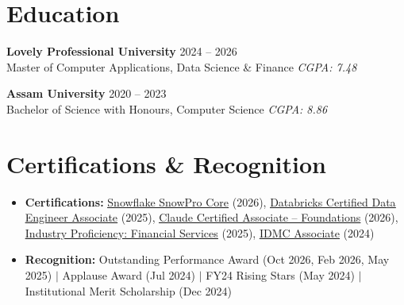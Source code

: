 \documentclass[a4paper,8pt]{article}
\begin{document}
\section{Education}
\textbf{Lovely Professional University} \hfill \color[HTML]{371e77} 2024 -- 2026 \color[HTML]{110223}\\
\color[HTML]{371e77} Master of Computer Applications, Data Science \& Finance \hfill \color[HTML]{4B28A4} {\small \textit{CGPA: 7.48}} \color[HTML]{110223}

\vspace{2pt}

\textbf{Assam University} \hfill \color[HTML]{371e77} 2020 -- 2023 \color[HTML]{110223}\\
\color[HTML]{371e77} Bachelor of Science with Honours, Computer Science \hfill \color[HTML]{4B28A4} {\small \textit{CGPA: 8.86}} \color[HTML]{110223}

\section{Certifications \& Recognition}
\begin{minipage}[t]{\linewidth}
    \begin{itemize}[nosep,after=\strut, leftmargin=2em, itemsep=3pt]
        \item \textbf{Certifications:} \href{https://achieve.snowflake.com/c2358c1b-4da5-4c9a-94c7-e9806cbb3edd}{\uline{Snowflake SnowPro Core}} (2026), \href{https://credentials.databricks.com/64cd3b85-77ab-4c9f-91ba-168c92d27739}{\uline{Databricks Certified Data Engineer Associate}} (2025), \href{https://www.credly.com/badges/c0856f6e-cd57-44e0-9e6c-249e6f24c2fb/public_url}{\uline{Claude Certified Associate -- Foundations}} (2026), \href{https://www.credly.com/badges/3668cded-264d-4834-8851-eb2cc87358d3}{\uline{Industry Proficiency: Financial Services}} (2025), \href{https://drive.google.com/file/d/1xK0TLpdXRCAxnX8DlwNyQrvbyeU8dWXC/view}{\uline{IDMC Associate}} (2024)
        \vspace{3pt}
        \item \textbf{Recognition:} Outstanding Performance Award (Oct 2026, Feb 2026, May 2025) $|$ Applause Award (Jul 2024) $|$ FY24 Rising Stars (May 2024) $|$ Institutional Merit Scholarship (Dec 2024)
    \end{itemize}
\end{minipage}
\end{document}
